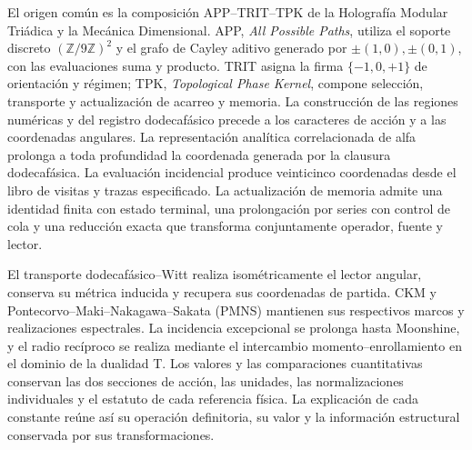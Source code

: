 El origen común es la composición APP--TRIT--TPK de la Holografía Modular
Triádica y la Mecánica Dimensional. APP, \emph{All Possible Paths},
utiliza el soporte discreto \((\mathbb Z/9\mathbb Z)^2\) y el grafo
de Cayley aditivo generado por \(\pm(1,0),\pm(0,1)\), con las
evaluaciones suma y producto. TRIT asigna la firma \(\{-1,0,+1\}\)
de orientación y régimen; TPK, \emph{Topological Phase Kernel},
compone selección, transporte y actualización de acarreo y memoria.
La construcción
de las regiones numéricas y del registro dodecafásico precede a los
caracteres de acción y a las coordenadas angulares. La representación
analítica correlacionada de alfa prolonga a toda profundidad la coordenada
generada por la clausura dodecafásica. La evaluación incidencial produce
veinticinco coordenadas desde el libro de visitas y trazas especificado.
La actualización de memoria admite una identidad finita con estado
terminal, una prolongación por series con control de cola y una reducción
exacta que transforma conjuntamente operador, fuente y lector.

El transporte dodecafásico--Witt realiza isométricamente el lector
angular, conserva su métrica inducida y recupera sus coordenadas de partida.
CKM y Pontecorvo--Maki--Nakagawa--Sakata (PMNS) mantienen sus respectivos
marcos y realizaciones espectrales.
La incidencia excepcional se prolonga hasta Moonshine, y el radio
recíproco se realiza mediante el intercambio momento--enrollamiento en
el dominio de la dualidad T. Los valores y las comparaciones cuantitativas
conservan las dos secciones de acción, las unidades, las normalizaciones
individuales y el estatuto de cada referencia física. La explicación de
cada constante reúne así su operación definitoria, su valor y la
información estructural conservada por sus transformaciones.

\vspace{2pt}

\par\endgroup
